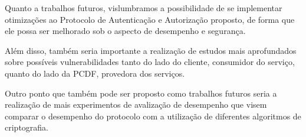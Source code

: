 Quanto a trabalhos futuros, vislumbramos a possibilidade de se implementar otimizações ao Protocolo de Autenticação e Autorização proposto, de forma que ele possa ser melhorado sob o aspecto de desempenho e segurança.

Além disso, também seria importante a realização de estudos mais aprofundados sobre possíveis vulnerabilidades tanto do lado do cliente, consumidor do serviço, quanto do lado da PCDF, provedora dos serviços.

Outro ponto que também pode ser proposto como trabalhos futuros seria a realização de mais experimentos de avalização de desempenho que visem comparar o desempenho do protocolo com a utilização  de diferentes algoritmos de criptografia.




